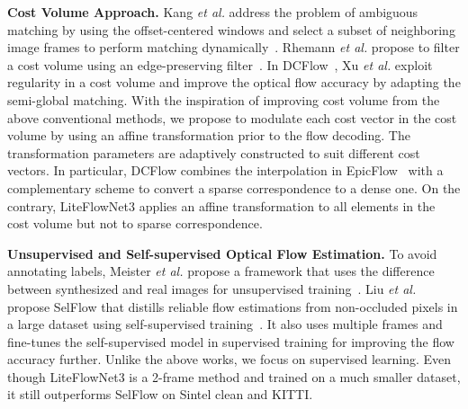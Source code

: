 \documentclass[runningheads]{llncs}
\newcommand{\etal}{\emph{et al. }}
\begin{document}
\noindent\textbf{Cost Volume Approach.} Kang \etal address the problem of ambiguous matching by using the offset-centered windows and select a subset of neighboring image frames to perform matching dynamically~\cite{Kang01}.
Rhemann \etal propose to filter a cost volume using an edge-preserving filter~\cite{Rhemann11}. 
In DCFlow~\cite{Xu17}, Xu \etal exploit regularity in a cost volume and improve the optical flow accuracy by adapting the semi-global matching. 
With the inspiration of improving cost volume from the above conventional methods, we propose to modulate each cost vector in the cost volume by using an affine transformation prior to the flow decoding. The transformation parameters are adaptively constructed to suit different cost vectors. 
In particular, DCFlow combines the interpolation in EpicFlow~\cite{Revaud15} with a complementary scheme to convert a sparse correspondence to a dense one. On the contrary, LiteFlowNet3 applies an affine transformation to all elements in the cost volume but not to sparse correspondence. 

\noindent \textbf{Unsupervised and Self-supervised Optical Flow Estimation.} To avoid annotating labels, Meister \etal propose a framework that uses the difference between synthesized and real images for unsupervised training~\cite{Meister18}. 
Liu \etal propose SelFlow that distills reliable flow estimations from non-occluded pixels in a large dataset using self-supervised training~\cite{Liu19}. It also uses multiple frames and fine-tunes the self-supervised model in supervised training for improving the flow accuracy further. 
Unlike the above works, we focus on supervised learning. Even though LiteFlowNet3 is a 2-frame method and   trained on a much smaller dataset, it still outperforms SelFlow on Sintel clean and KITTI. 
\end{document}
